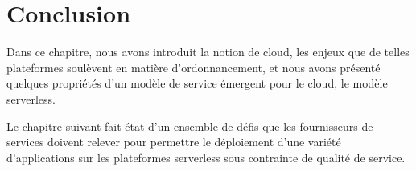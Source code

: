 
\section{Conclusion}

Dans ce chapitre, nous avons introduit la notion de cloud, les enjeux que de telles plateformes soulèvent en matière d'ordonnancement, et nous avons présenté quelques propriétés d'un modèle de service émergent pour le cloud, le modèle serverless.

Le chapitre suivant fait état d'un ensemble de défis que les fournisseurs de services doivent relever pour permettre le déploiement d'une variété d'applications sur les plateformes serverless sous contrainte de qualité de service.
